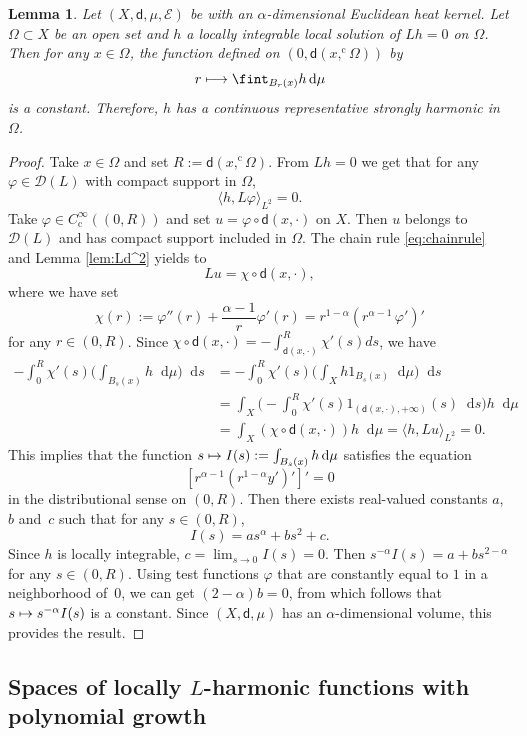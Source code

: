 \documentclass[JEP,XML,SOM,Unicode,published]{cedram}
\newcommand\mto{\mathchoice{\longmapsto}{\mapsto}{\mapsto}{\mapsto}}
\newcommand{\rmc}{\mathrm{c}}
\theoremstyle{plain}
\newtheorem{lemma}[theorem]{Lemma}
\theoremstyle{definition}
\newcommand{\cE}{\mathcal{E}}
\newcommand{\cD}{\mathcal{D}}
\let\phi\varphi
\newcommand{\di}{\mathop{}\!\mathrm{d}}
\newcommand{\dist}{\mathsf{d}}
\begin{document}
\begin{lemma}\label{lem:Lstrong} Let $(X,\dist,\mu,\cE)$ be with an $\alpha$-dimensional Euclidean heat kernel. Let $\Omega \subset X$ be an open set and $h$ a locally integrable local solution of $Lh=0$ on $\Omega$. Then for any $x \in \Omega$, the function defined on $(0,\dist(x,^\rmc\!\Omega))$ by
\[
r\mto \fint_{B_r(x)}h \di \mu
\]
is a constant. Therefore, $h$ has a continuous representative strongly harmonic in $\Omega$.
\end{lemma}
\begin{proof}
Take $x \in \Omega$ and set $R:=\dist(x,^\rmc\!\Omega)$. From $Lh=0$ we get that for any $\phi \in \cD(L)$ with compact support in $\Omega$,
\[
\langle h,L\phi\rangle_{L^2}=0.
\]
Take $\phi \in C_\rmc^\infty((0,R))$ and set
$u=\phi \circ \dist(x,\cdot)$ on $X$. Then $u$ belongs to $\cD(L)$ and has compact support included in $\Omega$. The chain rule \eqref{eq:chainrule} and Lemma \ref{lem:Ld^2} yields to
\[
Lu = \chi\circ \dist(x,\cdot),
\]
where we have set
\[
\chi(r):= \phi''(r) + \frac{\alpha - 1}{r} \phi'(r) = r^{1-\alpha} \left(r^{\alpha-1}\, \phi'\right)'
\]
for any $r \in (0,R)$. Since $\chi \circ \dist(x,\cdot)=-\int_{\dist(x,\cdot)}^R \chi'(s)ds$, we have
\begin{align*}
-\int_0^R \chi'(s)\biggl(\int_{B_s(x)}h\di\mu\biggr)\di s & = -\int_0^R \chi'(s)\biggl(\int_X h1_{B_s(x)}\di\mu\biggr)\di s\\
& = \int_X \biggl(- \int_0^R \chi'(s) 1_{(\dist(x,\cdot),+\infty)}(s) \di s \biggr) h \di \mu\\
& = \int_X (\chi \circ \dist(x,\cdot)) h \di \mu = \langle h,Lu\rangle_{L^2} = 0.
\end{align*}
This implies that the function
$s\mto I(s):= \int_{B_s(x)}h\di \mu$ satisfies the equation
\[
\left[r^{\alpha-1}\left(r^{1-\alpha}y'\right)'\right]'=0
\]
in the distributional sense on $(0,R)$. Then there exists real-valued constants $a$, $b$ and~$c$ such that for any $s \in (0,R)$,
\[
I(s)=as^\alpha+bs^2+c.
\]
Since $h$ is locally integrable, $c=\lim_{s\to 0} I(s) = 0$. Then $s^{-\alpha}I(s)= a+b s^{2-\alpha}$ for any $s \in (0,R)$. Using test functions $\phi$ that are constantly equal to $1$ in a neighborhood of~$0$, we can get
$(2-\alpha)b=0$, from which follows that $s \mto s^{-\alpha} I(s)$ is a constant. Since $(X,\dist,\mu)$ has an $\alpha$-dimensional volume, this provides the result.
\end{proof}

\subsection{Spaces of locally $L$-harmonic functions with polynomial growth}
\end{document}
